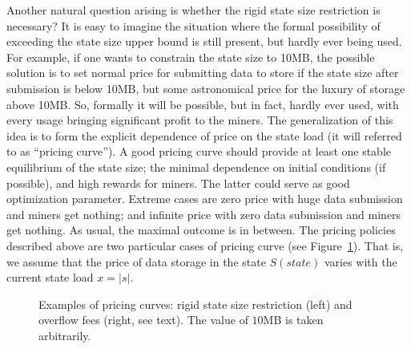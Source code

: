 \documentclass[]{llncs}   %
\begin{document}
Another natural question arising is whether the rigid state size restriction is
necessary?  It is easy to imagine the situation where the formal possibility of
exceeding the state size upper bound is still present, but hardly ever being used. For example,
if one wants to constrain the state size to 10MB, the possible solution is to
set normal price for submitting data to store if the state size after submission
is below 10MB, but some astronomical price for the luxury of storage above 10MB.
So, formally it will be possible, but in fact, hardly ever used, with every
usage bringing significant profit to the miners. The generalization of this idea is
to form the explicit dependence of price on the state load (it will referred to
as ``pricing curve''). A good pricing curve should provide at least one stable
equilibrium of the state size; the minimal dependence on initial conditions (if
possible), and high rewards for miners. The latter could serve as good
optimization parameter. Extreme cases are zero price with huge data submission and
miners get nothing; and infinite price with zero data submission and miners get
nothing. As usual, the maximal outcome is in between.  The pricing policies
described above are two particular cases of pricing curve (see
Figure~\ref{fig:steps}). That is, we assume that the price of data storage in the
state $S(state)$ varies with the current state load $x=|s|$. 
\begin{figure}[h]
    \hfill 
    \hfill 
    \hfill 
    \caption{ 
        Examples of pricing curves: rigid state size restriction (left) and 
        overflow fees (right, see text). The value of $10$MB is taken 
        arbitrarily.  
    } 
    \label{fig:steps}
\end{figure} 
\end{document}
